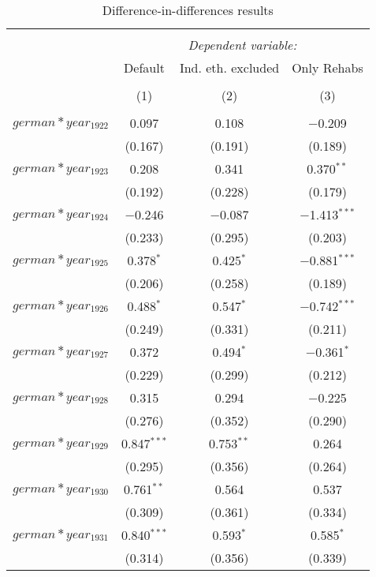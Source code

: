 
\begin{table}[!h] \centering 
  \caption{Difference-in-differences results} 
  \label{dif_table} 
\small 
\begin{tabular}{@{\extracolsep{5pt}}lccc} 
\\[-1.8ex]\hline 
\hline \\[-1.8ex] 
 & \multicolumn{3}{c}{\textit{Dependent variable:}} \\ 
\cline{2-4} 
 & Default & Ind. eth. excluded & Only Rehabs \\ 
\\[-1.8ex] & (1) & (2) & (3)\\ 
\hline \\[-1.8ex] 
 $german*year_1922$ & 0.097 & 0.108 & $-$0.209 \\ 
  & (0.167) & (0.191) & (0.189) \\ 
  $german*year_1923$ & 0.208 & 0.341 & 0.370$^{**}$ \\ 
  & (0.192) & (0.228) & (0.179) \\ 
  $german*year_1924$ & $-$0.246 & $-$0.087 & $-$1.413$^{***}$ \\ 
  & (0.233) & (0.295) & (0.203) \\ 
  $german*year_1925$ & 0.378$^{*}$ & 0.425$^{*}$ & $-$0.881$^{***}$ \\ 
  & (0.206) & (0.258) & (0.189) \\ 
  $german*year_1926$ & 0.488$^{*}$ & 0.547$^{*}$ & $-$0.742$^{***}$ \\ 
  & (0.249) & (0.331) & (0.211) \\ 
  $german*year_1927$ & 0.372 & 0.494$^{*}$ & $-$0.361$^{*}$ \\ 
  & (0.229) & (0.299) & (0.212) \\ 
  $german*year_1928$ & 0.315 & 0.294 & $-$0.225 \\ 
  & (0.276) & (0.352) & (0.290) \\ 
  $german*year_1929$ & 0.847$^{***}$ & 0.753$^{**}$ & 0.264 \\ 
  & (0.295) & (0.356) & (0.264) \\ 
  $german*year_1930$ & 0.761$^{**}$ & 0.564 & 0.537 \\ 
  & (0.309) & (0.361) & (0.334) \\ 
  $german*year_1931$ & 0.840$^{***}$ & 0.593$^{*}$ & 0.585$^{*}$ \\ 
  & (0.314) & (0.356) & (0.339) \\ 

\end{tabular}
\end{table}
